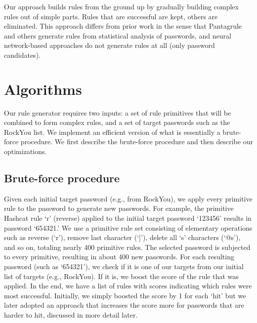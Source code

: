 \documentclass{article}
\begin{document}
Our approach builds rules from the ground up by gradually building complex rules out of simple parts. Rules that are successful are kept, others are eliminated. This approach differs from prior work in the sense that Pantagrule and others generate rules from statistical analysis of passwords, and neural network-based approaches do not generate rules at all (only password candidates).




\section{Algorithms}
\label{sec:algorithm}

Our rule generator requires two inputs: a set of rule primitives that will be
combined to form complex rules, and a set of target passwords such as the
RockYou list. We implement an efficient version of what is essentially a
brute-force procedure. We first describe the brute-force procedure and then
describe our optimizations.


\subsection{Brute-force procedure}

Given each initial target password (e.g., from RockYou), we apply every
primitive rule to the password to generate new passwords. For example, the
primitive Hashcat rule `r' (reverse) applied to the initial target password
`123456' results in password `654321.' We use a primitive rule set consisting
of elementary operations such as reverse (`r'), remove last character (`]'),
delete all `s' characters (`@s'), and so on, totaling nearly 400 primitive
rules. The selected password is subjected to every primitive, resulting in about
400 new passwords. For each resulting password (such as `654321'), we check if
it is one of our targets from our initial list of targets (e.g., RockYou). If it
is, we boost the score of the rule that was applied. In the end, we have a list
of rules with scores indicating which rules were most successful. Initially,
we simply boosted the score by 1 for each `hit' but we later adopted an
approach that increases the score more for passwords that are harder to hit,
discussed in more detail later.
\end{document}
